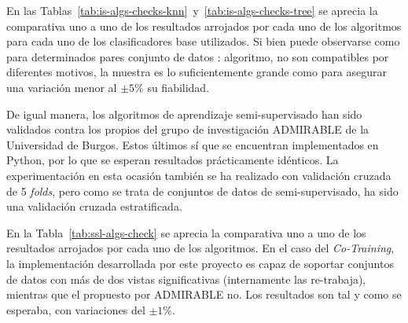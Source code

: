 En las Tablas~\ref{tab:is-algs-checks-knn}~y~\ref{tab:is-algs-checks-tree} se aprecia la comparativa uno a uno de los resultados arrojados por cada uno de los algoritmos para cada uno de los clasificadores base utilizados. Si bien puede observarse como para determinados pares conjunto de datos : algoritmo, no son compatibles por diferentes motivos, la muestra es lo suficientemente grande como para asegurar una variación menor al $\pm 5\%$ su fiabilidad.


De igual manera, los algoritmos de aprendizaje semi-supervisado han sido validados contra los propios del grupo de investigación ADMIRABLE de la Universidad de Burgos. Estos últimos sí que se encuentran implementados en Python, por lo que se esperan resultados prácticamente idénticos. La experimentación en esta ocasión también se ha realizado con validación cruzada de 5 \textit{folds}, pero como se trata de conjuntos de datos de semi-supervisado, ha sido una validación cruzada estratificada.

En la Tabla~\ref{tab:ssl-algs-check} se aprecia la comparativa uno a uno de los resultados arrojados por cada uno de los algoritmos. En el caso del \textit{Co-Training}, la implementación desarrollada por este proyecto es capaz de soportar conjuntos de datos con más de dos vistas significativas (internamente las re-trabaja), mientras que el propuesto por ADMIRABLE no. Los resultados son tal y como se esperaba, con variaciones del $\pm 1\%$.

